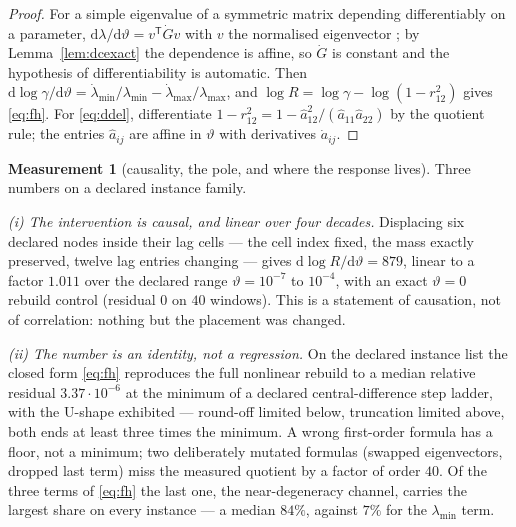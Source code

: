 \documentclass[11pt,a4paper]{article}
\theoremstyle{plain}
\theoremstyle{definition}
\newtheorem{measurement}[theorem]{Measurement}
\newcommand{\T}{\mathsf{T}}
\newcommand{\lmin}{\lambda_{\min}}
\newcommand{\lmax}{\lambda_{\max}}
\newcommand{\ah}{\widehat{a}}
\begin{document}
\begin{proof}
For a simple eigenvalue of a symmetric matrix depending differentiably on a
parameter, $\mathrm d\lambda/\mathrm d\vartheta=v^{\T}\dot Gv$ with $v$ the
normalised eigenvector \cite{Hellmann1937,Feynman1939}; by
Lemma~\ref{lem:dcexact} the dependence is affine, so $\dot G$ is constant and
the hypothesis of differentiability is automatic. Then
$\mathrm d\log\gamma/\mathrm d\vartheta
=\dot\lambda_{\min}/\lmin-\dot\lambda_{\max}/\lmax$, and
$\log R=\log\gamma-\log(1-r_{12}^{2})$ gives \eqref{eq:fh}. For
\eqref{eq:ddel}, differentiate
$1-r_{12}^{2}=1-\ah_{12}^{2}/(\ah_{11}\ah_{22})$ by the quotient rule; the
entries $\ah_{ij}$ are affine in $\vartheta$ with derivatives $\dot a_{ij}$.
\end{proof}

\begin{measurement}[causality, the pole, and where the response lives]
\label{meas:pole}
Three numbers on a declared instance family.

\emph{(i) The intervention is causal, and linear over four decades.} Displacing
six declared nodes inside their lag cells --- the cell index fixed, the mass
exactly preserved, twelve lag entries changing --- gives
$\mathrm d\log R/\mathrm d\vartheta=879$, linear to a factor $1.011$ over the
declared range $\vartheta=10^{-7}$ to $10^{-4}$, with an exact
$\vartheta=0$ rebuild control (residual $0$ on $40$ windows). This is a
statement of causation, not of correlation: nothing but the placement was
changed.

\emph{(ii) The number is an identity, not a regression.} On the declared
instance list the closed form \eqref{eq:fh} reproduces the full nonlinear rebuild to
a median relative residual $3.37\cdot10^{-6}$ at the minimum of a declared
central-difference step ladder, with the U-shape exhibited --- round-off limited
below, truncation limited above, both ends at least three times the minimum. A
wrong first-order formula has a floor, not a minimum; two deliberately mutated
formulas (swapped eigenvectors, dropped last term) miss the measured quotient by
a factor of order $40$. Of the three terms of \eqref{eq:fh} the last one, the
near-degeneracy channel, carries the largest share on every instance --- a
median $84\%$, against $7\%$ for the $\lmin$ term.


\end{measurement}
\end{document}
